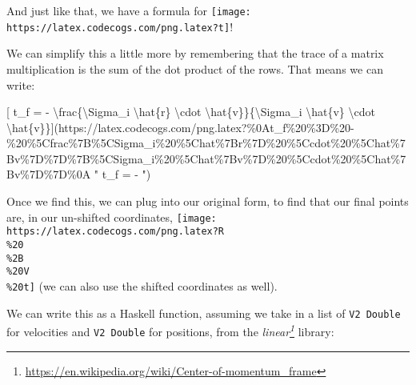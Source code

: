\documentclass[]{article}
\renewcommand{\href}[2]{#2\footnote{\url{#1}}}
\begin{document}
And just like that, we have a formula for
\texttt{[image: https://latex.codecogs.com/png.latex?t]}!

We can simplify this a little more by remembering that the trace of a matrix
multiplication is the sum of the dot product of the rows. That means we can
write:

{[} t\_f = - \textbackslash{}frac\{\textbackslash{}Sigma\_i
\textbackslash{}hat\{r\} \textbackslash{}cdot
\textbackslash{}hat\{v\}\}\{\textbackslash{}Sigma\_i \textbackslash{}hat\{v\}
\textbackslash{}cdot
\textbackslash{}hat\{v\}\}{]}(https://latex.codecogs.com/png.latex?\%0At\_f\%20\%3D\%20-\%20\%5Cfrac\%7B\%5CSigma\_i\%20\%5Chat\%7Br\%7D\%20\%5Ccdot\%20\%5Chat\%7Bv\%7D\%7D\%7B\%5CSigma\_i\%20\%5Chat\%7Bv\%7D\%20\%5Ccdot\%20\%5Chat\%7Bv\%7D\%7D\%0A
" t\_f = - 
")

Once we find this, we can plug into our original form, to find that our final
points are, in our un-shifted coordinates,
\texttt{[image: https://latex.codecogs.com/png.latex?R\\\%20\\\%2B\\\%20V\\\%20t]} (we
can also use the shifted coordinates as well).

We can write this as a Haskell function, assuming we take in a list of
\texttt{V2\ Double} for velocities and \texttt{V2\ Double} for positions, from
the \emph{\href{https://en.wikipedia.org/wiki/Center-of-momentum_frame}{linear}}
library:
\end{document}
